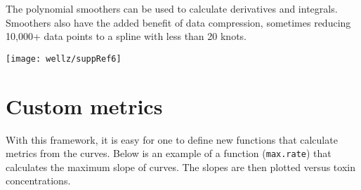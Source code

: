 The polynomial smoothers can be used to calculate derivatives and
integrals. Smoothers also have the added benefit of data compression, sometimes
reducing 10,000+ data points to a spline with less than 20 knots.

\singlespacing
\begin{knitrout}
\color{fgcolor}\begin{kframe}
\begin{alltt}
 \hlkwb{=}   \hlstd{=} \hlstd{)}
 \hlkwb{=}  \hlstd{(}\hlstd{,}\hlstd{,}\hlstd{),}
                        \hlstd{=}\hlstd{,} \hlstd{=}\hlstd{(}\hlopt{-}\hlstd{,}\hlstd{))}
 \hlkwb{=}  \hlstd{=}\hlstd{,} \hlstd{=}\hlopt{/}\hlstd{,} \hlstd{=}\hlstd{,}
                           \hlstd{=}\hlopt{/}\hlstd{,} \hlstd{=}\hlstd{(}\hlstd{,}\hlstd{) )}

\hlstd{(huvecs.smth[}\hlstd{(}\hlstd{,}\hlstd{,}\hlstd{,}\hlstd{)],}\hlstd{=}\hlstd{(}\hlopt{-}\hlstd{,}\hlstd{),}\hlstd{=}\hlstd{,}\hlstd{=}\hlstd{)}
\end{alltt}
\end{kframe}
\texttt{[image: wellz/suppRef6]} 
\end{knitrout}
\doublespacing

\section{Custom metrics}
With this framework, it is easy for one to define new functions that calculate
metrics from the curves. Below is an example of a function (\texttt{max.rate}) that calculates
the maximum slope of curves. The slopes are then plotted versus toxin concentrations.

